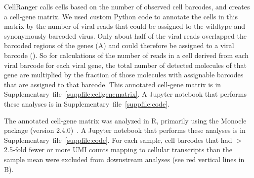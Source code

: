 \documentclass[9pt,lineno]{elife}
\begin{document}
CellRanger calls cells based on the number of observed cell barcodes, and creates a cell-gene matrix.
We used custom Python code to annotate the cells in this matrix by the number of viral reads that could be assigned to the wildtype and synonymously barcoded virus.
Only about half of the viral reads overlapped the barcoded regions of the genes (A) and could therefore be assigned to a viral barcode ().
So for calculations of the number of reads in a cell derived from each viral barcode for each viral gene, the total number of detected molecules of that gene are multiplied by the fraction of those molecules with assignable barcodes that are assigned to that barcode.
This annotated cell-gene matrix is in Supplementary~file~\ref{suppfile:cellgenematrix}.
A Jupyter notebook that performs these analyses is in Supplementary~file~\ref{suppfile:code}.

The annotated cell-gene matrix was analyzed in R, primarily using the Monocle package (version 2.4.0)~\citep{Qiu:2017dw,Trapnell:2014kg}.
A Jupyter notebook that performs these analyses is in Supplementary~file~\ref{suppfile:code}.
For each sample, cell barcodes that had $>$2.5-fold fewer or more UMI counts mapping to cellular transcripts than the sample mean were excluded from downstream analyses (see red vertical lines in B).
\end{document}
